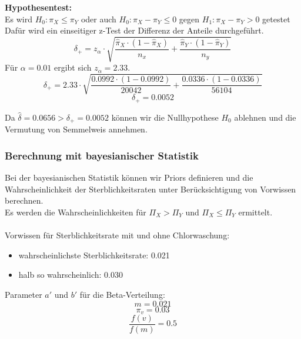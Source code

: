 \documentclass[a4paper,12pt]{article}
\begin{document}
\textbf{Hypothesentest:} \\
Es wird $H_0 : \pi_X \leq \pi_Y $ oder auch $H_0 : \pi_X - \pi_Y \leq 0$ gegen $H_1 : \pi_X - \pi_Y > 0$ getestet\\
Dafür wird ein einseitiger z-Test der Differenz der Anteile durchgeführt. \\
\begin{equation}
  \delta_+ = z_{\alpha} \cdot \sqrt{\frac{\hat{\pi}_X \cdot (1-\hat{\pi}_X)}{n_x} + \frac{\hat{\pi}_Y \cdot (1-\hat{\pi}_Y)}{n_y}}
\end{equation}
Für $\alpha = 0.01$ ergibt sich $z_{\alpha} = 2.33$.
\begin{equation}
  \delta_+ = 2.33 \cdot \sqrt{\frac{0.0992 \cdot (1-0.0992)}{20042} + \frac{0.0336 \cdot (1-0.0336)}{56104}}
\end{equation}
\begin{equation}
  \delta_+ = 0.0052
\end{equation}

Da $\hat{\delta} = 0.0656 > \delta_+ = 0.0052$ können wir die Nullhypothese $H_0$ ablehnen und die Vermutung von Semmelweis annehmen.


\subsubsection{Berechnung mit bayesianischer Statistik}
Bei der bayesianischen Statistik können wir Priors definieren und die Wahrscheinlichkeit der 
Sterblichkeitsraten unter Berücksichtigung von Vorwissen berechnen. \\
Es werden die Wahrscheinlichkeiten für $\Pi_X > \Pi_Y$ und $\Pi_X \leq \Pi_Y$ ermittelt. \\\\
Vorwissen für Sterblichkeitsrate mit und ohne Chlorwaschung:
\begin{itemize}
    \item wahrscheinlichste Sterblichkeitsrate: 0.021
    \item halb so wahrscheinlich: 0.030
\end{itemize}

Parameter $a'$ und $b'$ für die Beta-Verteilung:\\
\begin{equation}
  m = 0.021
\end{equation}
\begin{equation}
  \pi_v = 0.03
\end{equation}
\begin{equation}
  \frac{f(v)}{f(m)} = 0.5
\end{equation}
\end{document}
